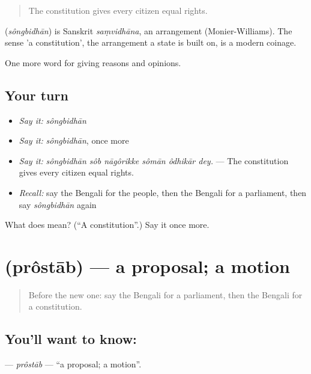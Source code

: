 \begin{quote}
The constitution gives every citizen equal rights.
\end{quote}

\begin{cousinweb}
\textbf{} (\emph{sôngbidhān}) is Sanskrit \emph{saṃvidhāna}, an arrangement (Monier-Williams). The sense 'a constitution', the arrangement a state is built on, is a modern coinage.
\end{cousinweb}

\begin{grammarlens}[title={What you've built}]
One more word for giving reasons and opinions.
\end{grammarlens}

\subsection*{Your turn}
\begin{itemize}
\raggedright
  \item \emph{Say it:} \emph{sôngbidhān}
  \item \emph{Say it:} \emph{sôngbidhān}, once more
  \item \emph{Say it:} \emph{sôngbidhān sôb nāgôrikke sômān ôdhikār dey.} — The constitution gives every citizen equal rights.
  \item \emph{Recall:} say the Bengali for the people, then the Bengali for a parliament, then say \emph{sôngbidhān} again
\end{itemize}

\begin{tcolorbox}[breakable,colback=teal!4,colframe=teal!35!black,title={Before you move on}]
What does  mean? (\textquotedblleft{}A constitution\textquotedblright{}.) Say it once more.
\end{tcolorbox}
\section[\texorpdfstring{\bn{প্রস্তাব} (prôstāb)}{প্রস্তাব (prôstāb)}]{ (prôstāb) — a proposal; a motion}

\label{lesson:BN-C345-prostab}



\begin{quote}
Before the new one: say the Bengali for a parliament, then the Bengali for a constitution.
\end{quote}

\subsection*{You'll want to know: }
\textbf{} — \emph{prôstāb} — \textquotedblleft{}a proposal; a motion\textquotedblright{}.

